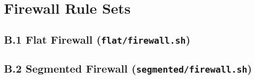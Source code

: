 \chapter{Firewall Rule Sets}
\label{ch:appendix-firewall}

\section*{B.1 \quad Flat Firewall (\texttt{flat/firewall.sh})}


\section*{B.2 \quad Segmented Firewall (\texttt{segmented/firewall.sh})}

